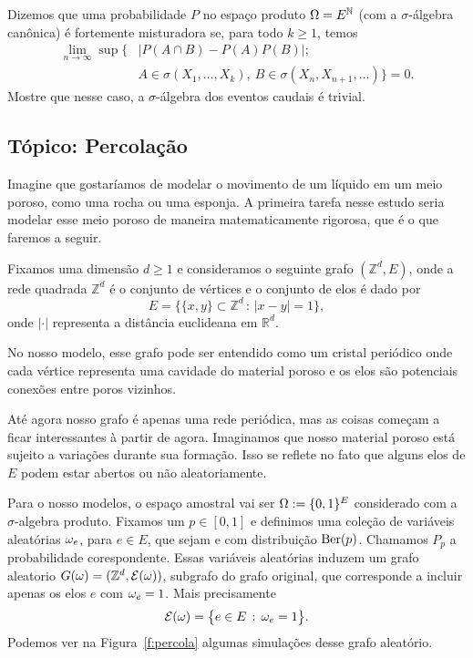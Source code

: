 \begin{exercise}
  Dizemos que uma probabilidade $P$ no espaço produto $\Omega = E^{{\mathbb N}}$ (com a $\sigma$-álgebra canônica) é fortemente misturadora se, para todo $k \geq 1$, temos
  \begin{equation}
    \begin{split}
      \lim_{n \to \infty} \sup \Big\{
      & \big| P(A \cap B) - P(A) P(B) \big|;\\
      & A \in \sigma(X_1, \dots, X_k),
        \ B \in \sigma(X_n, X_{n+1}, \dots) \Big\} = 0.
    \end{split}
  \end{equation}
  Mostre que nesse caso, a $\sigma$-álgebra dos eventos caudais é trivial.
\end{exercise}


 \begin{topics}
\section{Tópico: Percolação}
\label{s:percolacao}

Imagine que gostaríamos de modelar o movimento de um líquido em um meio poroso, como uma rocha ou uma esponja.
A primeira tarefa nesse estudo seria modelar esse meio poroso de maneira matematicamente rigorosa, que é o que faremos a seguir.

Fixamos uma dimensão $d \geq 1$ e consideramos o seguinte grafo $(\mathbb{Z}^d, E)$,
onde a rede quadrada $\mathbb{Z}^d$ é o conjunto de vértices e o conjunto de elos é dado por
\begin{equation*}
  E = \big\{ \{x, y\} \subset \mathbb{Z}^d \, : \,  |x - y| = 1 \},
\end{equation*}
onde $|\cdot|$ representa a distância euclideana em $\mathbb{R}^d$.

No nosso modelo, esse grafo pode ser entendido como um cristal periódico onde cada vértice representa uma cavidade do material poroso e os elos são potenciais conexões entre poros vizinhos.

Até agora nosso grafo é apenas uma rede periódica, mas as coisas começam a ficar interessantes à partir de agora.
Imaginamos que nosso material poroso está sujeito a variações durante sua formação.
Isso se reflete no fato que alguns elos de $E$ podem estar abertos ou não aleatoriamente.

Para o nosso modelos, o espaço amostral vai ser $\Omega:= \{0,1\}^E$ considerado com a $\sigma$-algebra produto.
Fixamos um $p \in [0,1]$ e definimos uma coleção de variáveis aleatórias $\omega_e$, para $e \in E$, que sejam \iid e com distribuição $\operatorname{Ber}(p)$.
Chamamos $P_p$ a probabilidade corespondente.
Essas variáveis aleatórias induzem um grafo aleatorio $G(\omega)=(\mathbb{Z}^d, \mathcal{E}(\omega))$, subgrafo do grafo original,
que corresponde a incluir apenas os elos $e$ com $\omega_e = 1$.
Mais precisamente
\begin{equation}
  \mathcal{E}(\omega) = \big\{ e \in E\, : \, \omega_e = 1 \big\}.
\end{equation}
Podemos ver na Figura~\ref{f:percola} algumas simulações desse grafo aleatório.


\end{topics}
